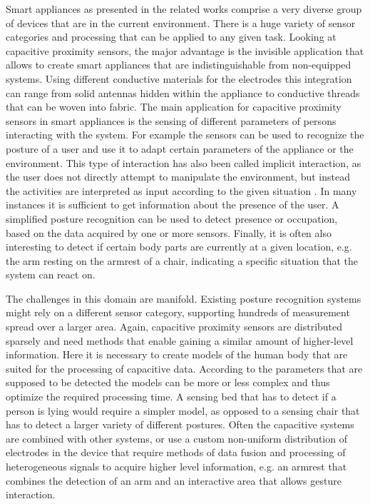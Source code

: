 Smart appliances as presented in the related works comprise a very diverse group of devices that are in the current environment. There is a huge variety of sensor categories and processing that can be applied to any given task. Looking at capacitive proximity sensors, the major advantage is the invisible application that allows to create smart appliances that are indistinguishable from non-equipped systems. Using different conductive materials for the electrodes this integration can range from solid antennas hidden within the appliance to conductive threads that can be woven into fabric. The main application for capacitive proximity sensors in smart appliances is the sensing of different parameters of persons interacting with the system. For example the sensors can be used to recognize the posture of a user and use it to adapt certain parameters of the appliance or the environment. This type of interaction has also been called implicit interaction, as the user does not directly attempt to manipulate the environment, but instead the activities are interpreted as input according to the given situation \cite{schmidt2001build}. In many instances it is sufficient to get information about the presence of the user. A simplified posture recognition can be used to detect presence or occupation, based on the data acquired by one or more sensors. Finally, it is often also interesting to detect if certain body parts are currently at a given location, e.g. the arm resting on the armrest of a chair, indicating a specific situation that the system can react on.

The challenges in this domain are manifold. Existing posture recognition systems might rely on a different sensor category, supporting hundreds of measurement spread over a larger area. Again, capacitive proximity sensors are distributed sparsely and need methods that enable gaining a similar amount of higher-level information. Here it is necessary to create models of the human body that are suited for the processing of capacitive data. According to the parameters that are supposed to be detected the models can be more or less complex and thus optimize the required processing time. A sensing bed that has to detect if a person is lying would require a simpler model, as opposed to a sensing chair that has to detect a larger variety of different postures. Often the capacitive systems are combined with other systems, or use a custom non-uniform distribution of electrodes in the device that require methods of data fusion and processing of heterogeneous signals to acquire higher level information, e.g. an armrest that combines the detection of an arm and an interactive area that allows gesture interaction.

